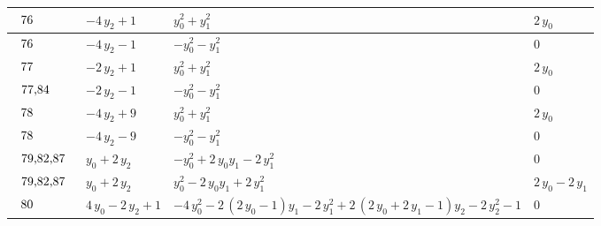 \begin{table}[H]
\begin{center}
{\begin{tabular}{|l|l|l|l|}
$\begin{tabular}{l}
76 \\
\end{tabular}$ & $ -4 \, y_{2} + 1 $ & $ y_{0}^{2} + y_{1}^{2} $ & $ 2 \, y_{0} $ \\ \hline
$\begin{tabular}{l}
76 \\
\end{tabular}$ & $ -4 \, y_{2} - 1 $ & $ -y_{0}^{2} - y_{1}^{2} $ & $ 0 $ \\ \hline
$\begin{tabular}{l}
77 \\
\end{tabular}$ & $ -2 \, y_{2} + 1 $ & $ y_{0}^{2} + y_{1}^{2} $ & $ 2 \, y_{0} $ \\ \hline
$\begin{tabular}{l}
77,84 \\
\end{tabular}$ & $ -2 \, y_{2} - 1 $ & $ -y_{0}^{2} - y_{1}^{2} $ & $ 0 $ \\ \hline
$\begin{tabular}{l}
78 \\
\end{tabular}$ & $ -4 \, y_{2} + 9 $ & $ y_{0}^{2} + y_{1}^{2} $ & $ 2 \, y_{0} $ \\ \hline
$\begin{tabular}{l}
78 \\
\end{tabular}$ & $ -4 \, y_{2} - 9 $ & $ -y_{0}^{2} - y_{1}^{2} $ & $ 0 $ \\ \hline
$\begin{tabular}{l}
79,82,87 \\
\end{tabular}$ & $ y_{0} + 2 \, y_{2} $ & $ -y_{0}^{2} + 2 \, y_{0} y_{1} - 2 \, y_{1}^{2} $ & $ 0 $ \\ \hline
$\begin{tabular}{l}
79,82,87 \\
\end{tabular}$ & $ y_{0} + 2 \, y_{2} $ & $ y_{0}^{2} - 2 \, y_{0} y_{1} + 2 \, y_{1}^{2} $ & $ 2 \, y_{0} - 2 \, y_{1} $ \\ \hline
$\begin{tabular}{l}
80 \\
\end{tabular}$ & $ 4 \, y_{0} - 2 \, y_{2} + 1 $ & $ -4 \, y_{0}^{2} - 2 \, {\left(2 \, y_{0} - 1\right)} y_{1} - 2 \, y_{1}^{2} + 2 \, {\left(2 \, y_{0} + 2 \, y_{1} - 1\right)} y_{2} - 2 \, y_{2}^{2} - 1 $ & $ 0 $ \\ \hline

\end{tabular}}
\end{center}
\end{table}
